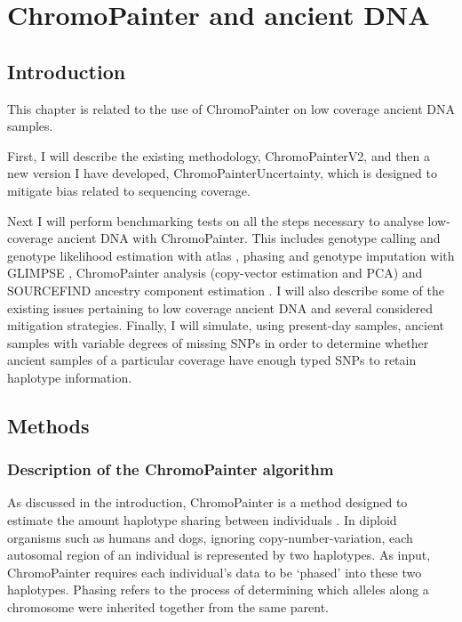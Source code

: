 \chapter{ChromoPainter and ancient DNA}
\label{chapterlabel2}

\section{Introduction}

This chapter is related to the use of ChromoPainter on low coverage ancient DNA samples. 

First, I will describe the existing methodology, ChromoPainterV2, and then a new version I have developed, ChromoPainterUncertainty, which is designed to mitigate bias related to sequencing coverage. 

Next I will perform benchmarking tests on all the steps necessary to analyse low-coverage ancient DNA with ChromoPainter. This includes genotype calling and genotype likelihood estimation with atlas \cite{Link2017}, phasing and genotype imputation with GLIMPSE \cite{rubinacci2021efficient}, ChromoPainter \cite{Lawson2012} analysis (copy-vector estimation and PCA) and SOURCEFIND ancestry component estimation \cite{Chacon-Duque2018}. I will also describe some of the existing issues pertaining to low coverage ancient DNA and several considered mitigation strategies. Finally, I will simulate, using present-day samples, ancient samples with variable degrees of missing SNPs in order to determine whether ancient samples of a particular coverage have enough typed SNPs to retain haplotype information.   

\section{Methods}

\subsection{Description of the ChromoPainter algorithm} \label{sec:ChromopainterDescription}

As discussed in the introduction, ChromoPainter is a method designed to estimate the amount haplotype sharing between individuals \cite{Lawson2012}. In diploid organisms such as humans and dogs, ignoring copy-number-variation, each autosomal region of an individual is represented by two haplotypes. As input, ChromoPainter requires each individual's data to be `phased' into these two haplotypes. Phasing refers to the process of determining which alleles along a chromosome were inherited together from the same parent. 

